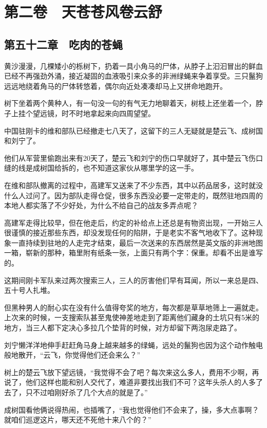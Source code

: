 \chapter{第二卷　天苍苍风卷云舒}

\section{第五十二章　吃肉的苍蝇}

黄沙漫漫，几棵矮小的栎树下，扔着一具小角马的尸体，从脖子上汩汩冒出的鲜血已经不再强劲外涌，接近凝固的血液吸引来众多的非洲绿蝇来争着享受。三只鬣狗远远地绕着角马的尸体转悠着，偶尔向近处凑凑却马上又拼命地跑开。

树下坐着两个黄种人，有一句没一句的有气无力地聊着天，树枝上还坐着一个，脖子上挂个望远镜，时不时地拿起来向四周望望。

中国驻刚卡的维和部队已经撤走七八天了，这留下的三人无疑就是楚云飞、成树国和刘宁了。

他们从军营里偷跑出来有20天了，楚云飞和刘宁的伤口早就好了，其中楚云飞伤口缝的线是成树国给拆的，也不知道这家伙从哪里学的这一手。

在维和部队撤离的过程中，高建军又送来了不少东西，其中以药品居多，这时就没什么人过问了。因为部队走得仓促，很多东西没必要一定带走的，既然驻地四周的本地人都实落了不少好处，为什么不给自己的战友多弄点呢？

高建军走得比较早，但在他走后，约定的补给点上还总是有物资出现，一开始三人很谨慎的接近那些东西，却没发现任何的陷阱，于是老实不客气地收下了。这种现象一直持续到驻地的人走完才结束，最后一次送来的东西居然是英文版的非洲地图一箱，崭新的那种，箱里附有纸条一张，上面只有两个字：保重。却看不出是谁写的。

这期间刚卡军队来过两次搜索三人，三人的厉害他们早有耳闻，所以一来总是四、五十号人扎堆。

但黑种男人的耐心实在没有什么值得夸奖的地方，每次都是草草地筛上一遍就走。上次来的时候，一支搜索队甚至鬼使神差地走到了距离他们藏身的土坑只有5米的地方，当三人都下定决心多拉几个垫背的时候，对方却留下两泡尿走路了。

刘宁懒洋洋地伸手赶赶角马身上越来越多的绿蝇，远处的鬣狗也因为这个动作触电般地散开，“云飞，你觉得他们还会来么？”

树上的楚云飞放下望远镜，“我觉得不会了吧？每次来这么多人，费用不少啊，再说了，他们这样也能和别人交代了，难道非要找出我们不可？这年头杀人的人多了去了，只不过咱刚好杀了几个大点的就是了。”

成树国看他俩说得热闹，也插嘴了，“我也觉得他们不会来了，操，多大点事啊？就咱们巡逻这片，哪天还不死他十来八个的？”

